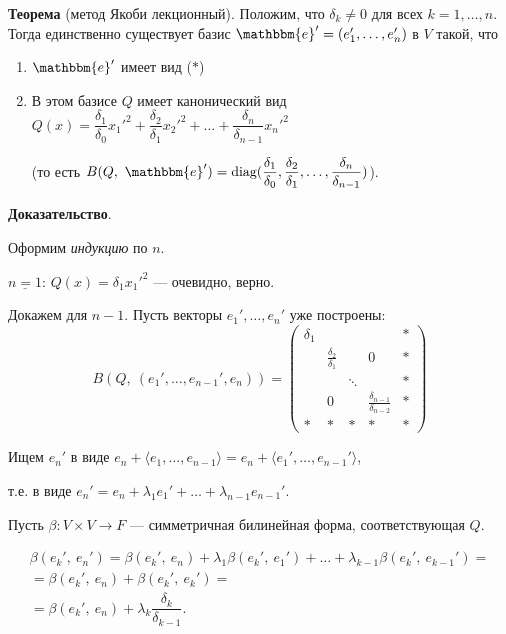 \documentclass[a4paper, 12pt]{article}
\newcommand{\me}{\mathbbm{e}}
\begin{document}
\vspace{5mm}
\textbf{Теорема} (метод Якоби лекционный). Положим, что $\delta_k \neq 0$ для всех $k = 1, \ldots, n$. Тогда единственно существует базис $\me' = (e_1', \ldots, e_n')$ в $V$ такой, что

\vspace{-3mm}
\begin{enumerate}
\itemsep=0em
\item $\me'$ имеет вид ($*$)
\item В этом базисе $Q$ имеет канонический вид $Q(x) = \dfrac{\delta_1}{\delta_0}x_1'^2 + \dfrac{\delta_2}{\delta_1}x_2'^2 + \ldots + \dfrac{\delta_n}{\delta_{n - 1}}x_n'^2$

(то есть $B(Q,\ \me') = \text{diag}(\dfrac{\delta_1}{\delta_0}, \dfrac{\delta_2}{\delta_1}, \ldots, \dfrac{\delta_n}{\delta_{n - 1}})$).
\end{enumerate}

\textbf{Доказательство}.

Оформим \textit{индукцию} по $n$.

$\underline{n = 1}$: $Q(x) = \delta_1x_1'^2$ --- очевидно, верно.

Докажем для $n - 1$. Пусть векторы $e_1', \ldots, e_n'$ уже построены:
\vspace{-3mm}
\[
B(Q,\ (e_1', \ldots, e_{n - 1}', e_n)) =
\begin{pmatrix}
\delta_1 &                           &        &                                       & * \\
& \frac{\delta_2}{\delta_1} &        &                 0                     & * \\
&                           & \ddots &                                       & * \\
&           0               &        & \frac{\delta_{n - 1}}{\delta_{n - 2}} & * \\
*     &              *            &    *   &                  *                    & *
\end{pmatrix}
\]

\vspace{-3mm}
Ищем $e_n'$ в виде $e_n + \langle e_1, \ldots, e_{n - 1} \rangle = e_n + \langle e_1', \ldots, e_{n - 1}' \rangle$,

т.е. в виде $e_n' = e_n + \lambda_1 e_1' + \ldots + \lambda_{n - 1}e_{n - 1}'$.

Пусть $\beta: V \times V \rightarrow F$ --- симметричная билинейная форма, соответствующая $Q$.

\vspace{-3mm}
\begin{gather*}
\beta(e_k',\ e_n') = 
\beta(e_k',\ e_n) + \lambda_1\beta(e_k',\ e_1') + \ldots + \lambda_{k - 1}\beta(e_k',\ e_{k - 1}') = \\
= \beta(e_k',\ e_n) + \beta(e_k',\ e_k') = \\
= \beta(e_k',\ e_n) + \lambda_k\dfrac{\delta_k}{\delta_{k - 1}}.
\end{gather*}
\end{document}
